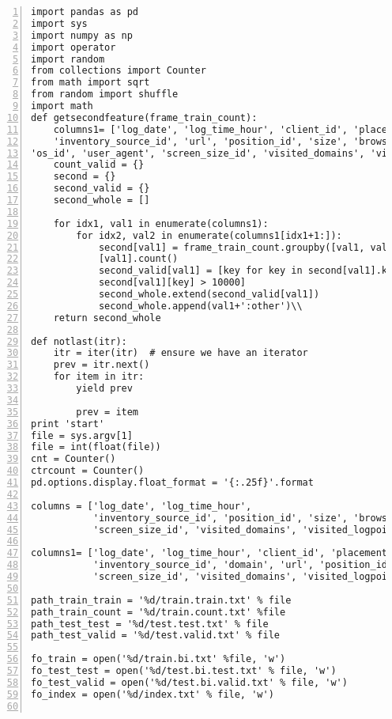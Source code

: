 \begin{lstlisting}[numbers=left, breaklines=true]
import pandas as pd
import sys
import numpy as np
import operator
import random
from collections import Counter
from math import sqrt
from random import shuffle
import math
def getsecondfeature(frame_train_count):
    columns1= ['log_date', 'log_time_hour', 'client_id', 'placement_id', \\
    'inventory_source_id', 'url', 'position_id', 'size', 'browser_id', \\
'os_id', 'user_agent', 'screen_size_id', 'visited_domains', 'visited_logpoints', 'clicker']
    count_valid = {}
    second = {}
    second_valid = {}
    second_whole = []

    for idx1, val1 in enumerate(columns1):
        for idx2, val2 in enumerate(columns1[idx1+1:]):
            second[val1] = frame_train_count.groupby([val1, val2])\\
            [val1].count()
            second_valid[val1] = [key for key in second[val1].keys() if \\
            second[val1][key] > 10000]
            second_whole.extend(second_valid[val1])
            second_whole.append(val1+':other')\\
    return second_whole

def notlast(itr):
    itr = iter(itr)  # ensure we have an iterator
    prev = itr.next()
    for item in itr:
        yield prev

        prev = item
print 'start'
file = sys.argv[1]
file = int(float(file))
cnt = Counter()
ctrcount = Counter()
pd.options.display.float_format = '{:.25f}'.format

columns = ['log_date', 'log_time_hour',
           'inventory_source_id', 'position_id', 'size', 'browser_id', 'os_id', 'user_agent',
           'screen_size_id', 'visited_domains', 'visited_logpoints', 'clicker', 'click_count']

columns1= ['log_date', 'log_time_hour', 'client_id', 'placement_id',
           'inventory_source_id', 'domain', 'url', 'position_id', 'size', 'browser_id', 'os_id', 'user_agent',
           'screen_size_id', 'visited_domains', 'visited_logpoints', 'clicker']

path_train_train = '%d/train.train.txt' % file
path_train_count = '%d/train.count.txt' %file
path_test_test = '%d/test.test.txt' % file
path_test_valid = '%d/test.valid.txt' % file

fo_train = open('%d/train.bi.txt' %file, 'w')
fo_test_test = open('%d/test.bi.test.txt' % file, 'w')
fo_test_valid = open('%d/test.bi.valid.txt' % file, 'w')
fo_index = open('%d/index.txt' % file, 'w')


\end{lstlisting}
